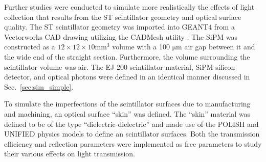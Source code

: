Further studies were conducted to simulate more realistically the effects of light collection that results from the ST scintillator geometry and optical surface quality.  The ST scintillator geometry was imported into GEANT4 from a Vectorworks CAD drawing utilizing the CADMesh utility \cite{cadmesh_g4}. %
The SiPM was constructed as a $12 \times 12 \times 10 \mathrm{mm^{3}}$ volume with a 100 $\mathrm{\mu m}$ air gap between it and the wide end of the straight section.  Furthermore, the volume surrounding the scintillator volume was air.  The EJ-200 scintillator material, SiPM silicon detector, and optical photons were defined in an identical manner discussed in Sec.~\ref{sec:sim_simple}.

To simulate the imperfections of the scintillator surfaces due to manufacturing and machining, an optical surface ``skin'' was defined.  The ``skin'' material was defined to be of the type ``dielectric-dielectric'' and made use of the POLISH and UNIFIED physics models \cite{scint_surface_sim} to define an scintillator surfaces.  Both the transmission efficiency and reflection parameters were implemented as free parameters to study their various effects on light transmission.

